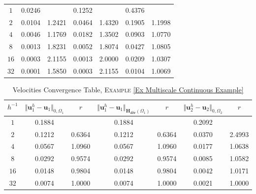 \documentclass[3p]{elsarticle}
\def\uone{\mathbf{u}_{1}}
\def\utwo{\mathbf{u}_{2}}
\def\Hdiv{\mathbf{H_{div}}}
\begin{document}
\begin{example}
\begin{table}[h!]
\begin{center}
\begin{tabular}{ c c c c c c c }
    \toprule
$ 1 $ &   0.0246  &   &  0.1252  &  &   0.4376 &   \\
$ 2 $  &  0.0104  &  1.2421   &  0.0464  & 1.4320   & 0.1905  &  1.1998   \\
$ 4 $ &   0.0046  &  1.1769 &  0.0182  & 1.3502    &  0.0903  &   1.0770   \\
$ 8 $  &  0.0013  &    1.8231 &  0.0052  & 1.8074   &  0.0427  &  1.0805    \\ 
%
$ 16 $  &  0.0003  &     2.1155 &  0.0013  & 2.0000    &  0.0209  &  1.0307 \\ 
%
$ 32 $  &  0.0001  &     1.5850  &  0.0003  & 2.1155   &  0.0104   &   1.0069  \\ 
%
    \hline
\end{tabular}
\end{center}
%
\end{table}
%
%
\begin{table*}[h!]
\caption{Velocities Convergence Table, \textsc{Example} \ref{Ex Multiscale Continuous Example}}\label{Table Mult Velocity Approximation}
\def\arraystretch{1.4}
\begin{center}
\begin{tabular}{ c c c c c c c }
    \hline
    \rowcolor{gray!50}
$ h^{-1} $  
& $\Vert  \uone^{h}- \uone  \Vert_{ 0, \Omega_{1} } $ 
& $r$  
& $\Vert  \uone^{h}- \uone  \Vert_{\Hdiv(\Omega_{1})}$ 
& $r$
& $\Vert  \utwo^{h}- \utwo  \Vert_{ 0, \Omega_{2} } $ 
& $r$ \\ %
    \toprule
$ 1 $ &   0.1884 &    &   0.1884  &  &   0.2092  & \\
$ 2 $  &   0.1212  &  0.6364   &  0.1212  &  0.6364   &  0.0370   &  2.4993 \\
$ 4 $ &   0.0567  &  1.0960  &  0.0567  &   1.0960  &  0.0177   &  1.0638  \\
$ 8 $  &  0.0292  &   0.9574  &  0.0292  &   0.9574   &   0.0085 &  1.0582   \\ 
%
$ 16 $  &  0.0148  &  0.9804  &  0.0148  &  0.9804   &  0.0042  &  1.0171   \\ 
%
$ 32 $  &  0.0074  & 1.0000  &  0.0074   &  1.0000   &  0.0021  &  1.0000   \\ 
%
    \hline
\end{tabular}
\end{center}
%
\end{table*}
%
%
\end{example}
\end{document}
